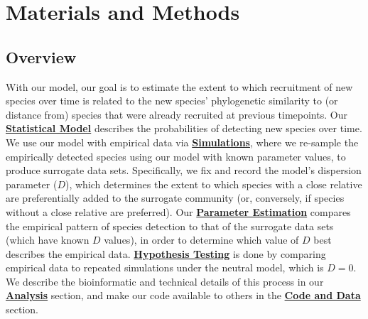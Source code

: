 \documentclass{article}
\begin{document}
\section{Materials and Methods}

\subsection{Overview} \label{sec:overview}
With our model, our goal is to estimate the extent to which recruitment of new species over time is related to the new species' phylogenetic similarity to (or distance from) species that were already recruited at previous timepoints. Our \hyperref[sec:statisticalModel]{\textbf{Statistical Model}} describes the probabilities of detecting new species over time. We use our model with empirical data via \hyperref[sec:simulations]{\textbf{Simulations}}, where we re-sample the empirically detected species using our model with known parameter values, to produce surrogate data sets. Specifically, we fix and record the model’s dispersion parameter (\(D\)), which determines the extent to which species with a close relative are preferentially added to the surrogate community (or, conversely, if species without a close relative are preferred). Our \hyperref[sec:parameterEstimation]{\textbf{Parameter Estimation}} compares the empirical pattern of species detection to that of the surrogate data sets (which have known \(D\) values), in order to determine which value of \(D\) best describes the empirical data. \hyperref[sec:hypothesisTesting]{\textbf{Hypothesis Testing}} is done by comparing empirical data to repeated simulations under the neutral model, which is \(D=0\). We describe the bioinformatic and technical details of this process in our \hyperref[sec:analysis]{\textbf{Analysis}} section, and make our code available to others in the \hyperref[sec:codeAndData]{\textbf{Code and Data}} section.
\end{document}
